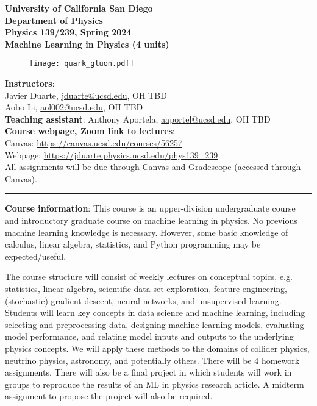 \documentclass[12pt]{article}
\begin{document}
\begin{center}
	\textbf{University of California San Diego\\
		Department of Physics\\
		Physics 139/239, Spring 2024\\
		Machine Learning in Physics (4 units)}
\end{center}

\begin{figure}[h!]
	\centering
	\texttt{[image: quark\_gluon.pdf]}
\end{figure}

\noindent\textbf{Instructors}:\\
Javier Duarte, \href{mailto:jduarte@ucsd.edu}{jduarte@ucsd.edu}, OH TBD\\
Aobo Li, \href{mailto:aol002@ucsd.edu}{aol002@ucsd.edu}, OH TBD\\
\noindent \textbf{Teaching assistant}: Anthony Aportela, \href{mailto:aaportel@ucsd.edu}{aaportel@ucsd.edu}, OH TBD\\

\noindent\textbf{Course webpage, Zoom link to lectures}:\\
\hspace*{1cm}Canvas: \href{https://canvas.ucsd.edu/courses/56257}{https://canvas.ucsd.edu/courses/56257}\\
\hspace*{1cm}Webpage: \href{https://jduarte.physics.ucsd.edu/phys139\_239}{https://jduarte.physics.ucsd.edu/phys139\_239}\\
\hspace*{1cm}All assignments will be due through Canvas and Gradescope (accessed through Canvas).\\

\begin{center}
	\rule{\textwidth}{0.5pt}
\end{center}

\noindent\textbf{Course information}: This course is an upper-division undergraduate course and introductory graduate course on machine learning in physics.
No previous machine learning knowledge is necessary.
However, some basic knowledge of calculus, linear algebra, statistics, and Python programming may be expected/useful.

The course structure will consist of weekly lectures on conceptual topics, e.g. statistics, linear algebra, scientific data set exploration, feature engineering, (stochastic) gradient descent, neural networks, and unsupervised learning.
Students will learn key concepts in data science and machine learning, including selecting and preprocessing data, designing machine learning models, evaluating model performance, and relating model inputs and outputs to the underlying physics concepts.
We will apply these methods to the domains of collider physics, neutrino physics, astronomy, and potentially others.
There will be 4 homework assignments.
There will also be a final project in which students will work in groups to reproduce the results of an ML in physics research article.
A midterm assignment to propose the project will also be required.
\end{document}
